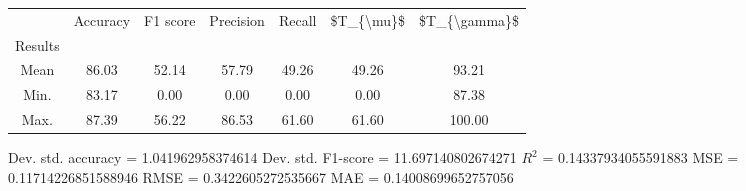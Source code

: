 \begin{tabular}{|c|c|c|c|c|c|c|}
\toprule
{} &  Accuracy &  F1 score &  Precision &  Recall &  \$T\_\{\textbackslash mu\}\$ &  \$T\_\{\textbackslash gamma\}\$ \\
Results &           &           &            &         &            &               \\
\hline
Mean    &     86.03 &     52.14 &      57.79 &   49.26 &      49.26 &         93.21 \\
Min.    &     83.17 &      0.00 &       0.00 &    0.00 &       0.00 &         87.38 \\
Max.    &     87.39 &     56.22 &      86.53 &   61.60 &      61.60 &        100.00 \\
\bottomrule
\end{tabular}

 Dev. std. accuracy = 1.041962958374614
 Dev. std. F1-score = 11.697140802674271
 $R^2$ = 0.14337934055591883
 MSE = 0.11714226851588946
 RMSE = 0.3422605272535667
 MAE = 0.14008699652757056